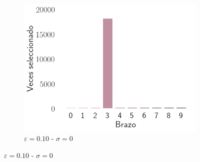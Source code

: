 \documentclass[12pt]{article}
\begin{document}
\begin{figure}[h]
\begin{subfigure}[H]{0.3\textwidth}
            \includegraphics[width=\textwidth]{../img/arm_sigma_0_epsilon_0.1}
            \caption{$\varepsilon=0.10$ - $\sigma=0$}
            \label{fig:arms_selected_0_0.1}
        \end{subfigure}


\end{figure}
\end{document}
